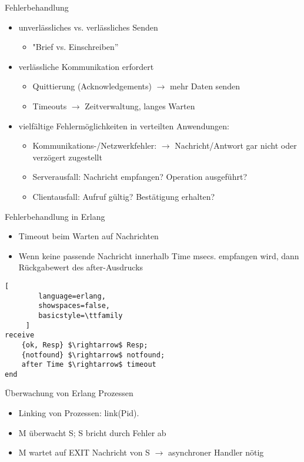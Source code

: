 \documentclass[10pt]{article}
\begin{document}
Fehlerbehandlung
\begin{itemize}
  \item unverlässliches vs. verlässliches Senden
        \begin{itemize}
          \item "Brief vs. Einschreiben”
        \end{itemize}
  \item verlässliche Kommunikation erfordert
        \begin{itemize}
          \item Quittierung (Acknowledgements) $\rightarrow$ mehr Daten senden
          \item Timeouts $\rightarrow$ Zeitverwaltung, langes Warten
        \end{itemize}
  \item vielfältige Fehlermöglichkeiten in verteilten Anwendungen:
        \begin{itemize}
          \item Kommunikations-/Netzwerkfehler: $\rightarrow$ Nachricht/Antwort gar nicht oder verzögert zugestellt
          \item Serverausfall: Nachricht empfangen? Operation ausgeführt?
          \item Clientausfall: Aufruf gültig? Bestätigung erhalten?
        \end{itemize}
\end{itemize}

Fehlerbehandlung in Erlang
\begin{itemize}
  \item Timeout beim Warten auf Nachrichten
  \item Wenn keine passende Nachricht innerhalb Time msecs. empfangen wird, dann Rückgabewert des after-Ausdrucks
\end{itemize}
\begin{lstlisting}[
        language=erlang,
        showspaces=false,
        basicstyle=\ttfamily
     ]
receive
    {ok, Resp} $\rightarrow$ Resp;
    {notfound} $\rightarrow$ notfound;
    after Time $\rightarrow$ timeout
end
\end{lstlisting}

Überwachung von Erlang Prozessen
\begin{itemize}
  \item Linking von Prozessen: link(Pid).
  \item M überwacht S; S bricht durch Fehler ab
  \item M wartet auf EXIT Nachricht von S $\rightarrow$ asynchroner Handler nötig
\end{itemize}
\end{document}
